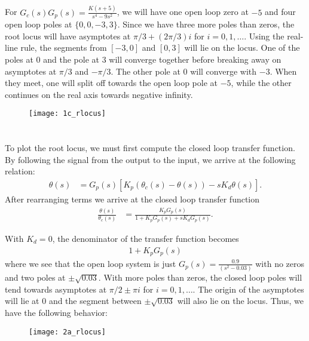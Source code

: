 \documentclass[paper=letter, fontsize=11pt]{scrartcl} %
\numberwithin{equation}{section} %
\numberwithin{figure}{section} %
\numberwithin{table}{section} %
\begin{document}
\subsection{}
For $G_c(s)G_p(s) = \frac{K(s+5)}{s^4 - 9s^2}$, we will have one open loop zero at $-5$ 
and four open loop poles at $\{0, 0, -3, 3\}$. Since we have three more poles than zeros, 
the root locus will have asymptotes at $\pi/3 + (2\pi/3) i$ for $i = 0, 1, \ldots$. Using the
real-line rule, the segments from $[-3, 0]$ and $[0, 3]$ will lie on the locus. One of the poles
at $0$ and the pole at $3$ will converge together before breaking away on asymptotes at $\pi/3$ and 
$-\pi/3$. The other pole at $0$ will converge with $-3$. When they meet, one will split off
towards the open loop pole at $-5$, while the other continues on the real axis towards 
negative infinity.
\begin{figure}[h!]
  \centering
  \texttt{[image: 1c\_rlocus]}
\end{figure}

\pagebreak
\section{}
\subsection{} 
To plot the root locus, we must first compute the closed loop transfer function. By following
the signal from the output to the input, we arrive at the following relation:
\begin{align*}
\theta(s) &= G_p(s) [K_p(\theta_c(s) - \theta(s)) - sK_d \theta(s)].
\end{align*}
After rearranging terms we arrive at the closed loop transfer function
\begin{align*}
\frac{\theta(s)}{\theta_c(s)} &= \frac{K_pG_p(s)}{1 + K_pG_p(s) + sK_dG_p(s)}.
\end{align*}

With $K_d = 0$, the denominator of the transfer function becomes
\begin{align*}
1 + K_pG_p(s)
\end{align*}
where we see that the open loop system is just $G_p(s) = \frac{0.9}{(s^2 - 0.03)}$ with no
zeros and two poles at $\pm \sqrt{0.03}$. With more poles than zeros, the closed loop poles
will tend towards asymptotes at $\pi/2 \pm \pi i$ for $i = 0, 1, \ldots$. The origin of the
asymptotes will lie at $0$ and the segment between $\pm \sqrt{0.03}$ will also lie on the
locus. Thus, we have the following behavior:
\begin{figure}[h!]
  \centering
  \texttt{[image: 2a\_rlocus]}
\end{figure}
\end{document}
